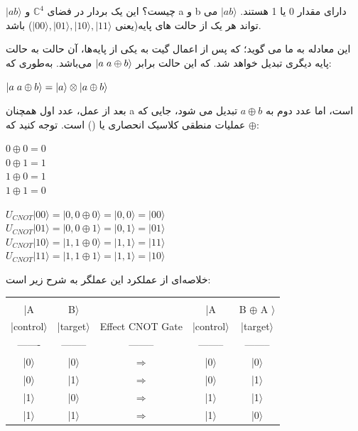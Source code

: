 \documentclass{book}
\begin{document}
 $\vert ab \rangle$ چیست؟
  این یک بردار در فضای $\mathbb{C}^4$ و a و b دارای مقدار 0 یا 1 هستند.  $\vert ab \rangle$ می تواند هر یک از حالت های پایه(یعنی  $\vert 00 \rangle, \vert 01 \rangle, \vert 10 \rangle, \vert 11 \rangle$) باشد.
 
  
  
   این معادله به ما می گوید؛ که پس از اعمال گیت  به یکی از پایه‌ها، آن حالت به حالت پایه دیگری تبدیل خواهد شد. که این حالت برابر $\vert a\hspace{0.1cm} a \oplus b\rangle$ می‌باشد. به‌طوری که:
   
   \begin{center}
   	$\vert a\hspace{0.1cm}a\oplus b\rangle = \vert a \rangle \otimes \vert a \oplus b \rangle$ 
   \end{center}

 بعد از عمل، عدد اول همچنان a است، اما عدد دوم به $a \oplus b$ تبدیل می شود، جایی که $\oplus$ عملیات منطقی کلاسیک انحصاری یا () است. توجه کنید که:
 \begin{center}
 	$0 \oplus 0 = 0$\\
 	$0 \oplus 1 = 1$\\
 	$1 \oplus 0 = 1$\\
 	$1 \oplus 1 = 0$\\
 \end{center}
 
\begin{center}
	$U_{CNOT}|00\rangle=|0,0 \oplus 0\rangle=|0,0\rangle=|00\rangle$ \\
	$U_{CNOT}|01\rangle=|0,0 \oplus 1\rangle=|0,1\rangle=|01\rangle$ \\
	$U_{CNOT}|10\rangle=|1,1 \oplus 0\rangle=|1,1\rangle=|11\rangle$\\
	$U_{CNOT}|11\rangle=|1,1 \oplus 1\rangle=|1,1\rangle=|10\rangle$
\end{center}

خلاصه‌ای از عملکرد این عملگر به شرح زیر است:\\

\begin{latin}
\begin{tabular}{ccccc}
	&&&&\\
	|A & B$\rangle$ &	&  |A &B $\oplus$ A $\rangle$  \\
	|control$\rangle$ & |target$\rangle$ & Effect CNOT Gate &|control$\rangle$ & |target$\rangle$ \\
	------- & -------- & -------- & -------- & --------  \\
	|0$\rangle$ & |0$\rangle$ & $\Longrightarrow$ &|0$\rangle$ & |0$\rangle$ \\
	|0$\rangle$ & |1$\rangle$ & $\Longrightarrow$ &|0$\rangle$ & |1$\rangle$ \\
	|1$\rangle$ & |0$\rangle$ & $\Longrightarrow$ &|1$\rangle$ & |1$\rangle$ \\
	|1$\rangle$ & |1$\rangle$ & $\Longrightarrow$ &|1$\rangle$ & |0$\rangle$
\end{tabular}
\end{latin}
\end{document}
